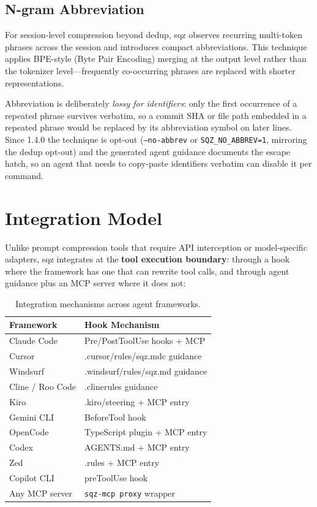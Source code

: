 \documentclass[10pt,twocolumn]{article}
\begin{document}
\subsection{N-gram Abbreviation}

For session-level compression beyond dedup, sqz observes recurring multi-token phrases across the session and introduces compact abbreviations. This technique applies BPE-style (Byte Pair Encoding) merging at the output level rather than the tokenizer level---frequently co-occurring phrases are replaced with shorter representations.

Abbreviation is deliberately \emph{lossy for identifiers}: only the first occurrence of a repeated phrase survives verbatim, so a commit SHA or file path embedded in a repeated phrase would be replaced by its abbreviation symbol on later lines. Since 1.4.0 the technique is opt-out (\texttt{--no-abbrev} or \texttt{SQZ\_NO\_ABBREV=1}, mirroring the dedup opt-out) and the generated agent guidance documents the escape hatch, so an agent that needs to copy-paste identifiers verbatim can disable it per command.

\section{Integration Model}

Unlike prompt compression tools that require API interception or model-specific adapters, sqz integrates at the \textbf{tool execution boundary}: through a hook where the framework has one that can rewrite tool calls, and through agent guidance plus an MCP server where it does not:

\begin{table}[h]
\centering
\small
\begin{tabular}{@{}ll@{}}
\toprule
\textbf{Framework} & \textbf{Hook Mechanism} \\
\midrule
Claude Code & Pre/PostToolUse hooks + MCP \\
Cursor & .cursor/rules/sqz.mdc guidance \\
Windsurf & .windsurf/rules/sqz.md guidance \\
Cline / Roo Code & .clinerules guidance \\
Kiro & .kiro/steering + MCP entry \\
Gemini CLI & BeforeTool hook \\
OpenCode & TypeScript plugin + MCP entry \\
Codex & AGENTS.md + MCP entry \\
Zed & .rules + MCP entry \\
Copilot CLI & preToolUse hook \\
Any MCP server & \texttt{sqz-mcp proxy} wrapper \\
\bottomrule
\end{tabular}
\caption{Integration mechanisms across agent frameworks.}
\label{tab:integration}
\end{table}
\end{document}

